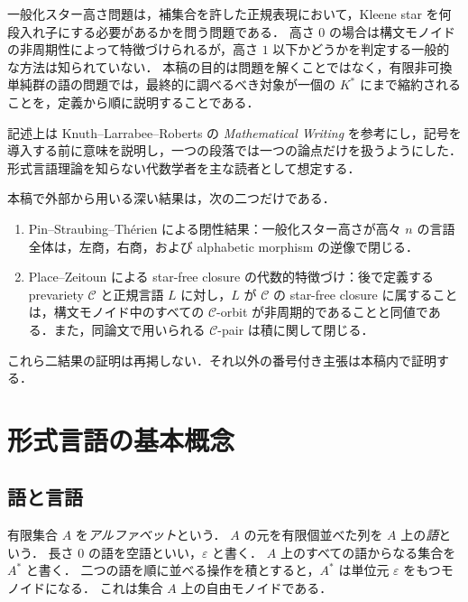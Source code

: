 一般化スター高さ問題は，補集合を許した正規表現において，Kleene star を何段入れ子にする必要があるかを問う問題である．
高さ $0$ の場合は構文モノイドの非周期性によって特徴づけられるが，高さ $1$ 以下かどうかを判定する一般的な方法は知られていない．
本稿の目的は問題を解くことではなく，有限非可換単純群の語の問題では，最終的に調べるべき対象が一個の $K^*$ にまで縮約されることを，定義から順に説明することである．

記述上は Knuth--Larrabee--Roberts の \emph{Mathematical Writing} を参考にし，記号を導入する前に意味を説明し，一つの段落では一つの論点だけを扱うようにした\cite{KnuthLarrabeeRoberts1989}．
形式言語理論を知らない代数学者を主な読者として想定する．

本稿で外部から用いる深い結果は，次の二つだけである．

\begin{enumerate}
\item Pin--Straubing--Th\'erien による閉性結果：一般化スター高さが高々 $n$ の言語全体は，左商，右商，および alphabetic morphism の逆像で閉じる\cite{PinStraubingTherien1992}．
\item Place--Zeitoun による star-free closure の代数的特徴づけ：後で定義する prevariety $\mathcal C$ と正規言語 $L$ に対し，$L$ が $\mathcal C$ の star-free closure に属することは，構文モノイド中のすべての $\mathcal C$-orbit が非周期的であることと同値である\cite[Theorem~5.11]{PlaceZeitoun2025}．また，同論文で用いられる $\mathcal C$-pair は積に関して閉じる．
\end{enumerate}

これら二結果の証明は再掲しない．それ以外の番号付き主張は本稿内で証明する．

\section{形式言語の基本概念}

\subsection{語と言語}

\begin{definition}
有限集合 $A$ を\emph{アルファベット}という．
$A$ の元を有限個並べた列を $A$ 上の\emph{語}という．
長さ $0$ の語を空語といい，$\varepsilon$ と書く．
$A$ 上のすべての語からなる集合を $A^*$ と書く．
二つの語を順に並べる操作を積とすると，$A^*$ は単位元 $\varepsilon$ をもつモノイドになる．
これは集合 $A$ 上の自由モノイドである．
\end{definition}

